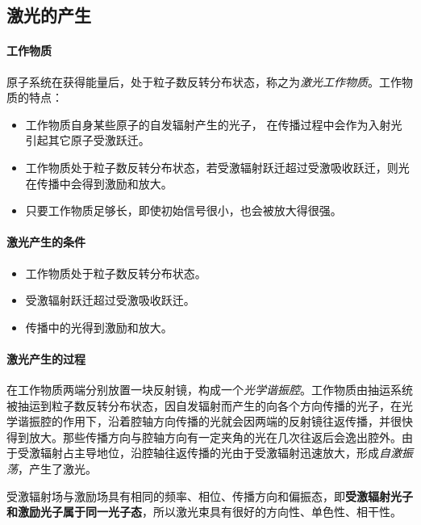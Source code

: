 \subsection{激光的产生} %
\paragraph{工作物质}原子系统在获得能量后，处于粒子数反转分布状态，称之为\textit{激光工作物质}。工作物质的特点：\begin{itemize}
	\item 工作物质自身某些原子的自发辐射产生的光子， 在传播过程中会作为入射光引起其它原子受激跃迁。
	\item 工作物质处于粒子数反转分布状态，若受激辐射跃迁超过受激吸收跃迁，则光在传播中会得到激励和放大。
	\item 只要工作物质足够长，即使初始信号很小，也会被放大得很强。
\end{itemize}

\paragraph{激光产生的条件}\begin{itemize}
	\item 工作物质处于粒子数反转分布状态。
	\item 受激辐射跃迁超过受激吸收跃迁。
	\item 传播中的光得到激励和放大。
\end{itemize}

\paragraph{激光产生的过程}在工作物质两端分别放置一块反射镜，构成一个\textit{光学谐振腔}。工作物质由抽运系统被抽运到粒子数反转分布状态，因自发辐射而产生的向各个方向传播的光子，在光学谐振腔的作用下，沿着腔轴方向传播的光就会因两端的反射镜往返传播，并很快得到放大。那些传播方向与腔轴方向有一定夹角的光在几次往返后会逸出腔外。由于受激辐射占主导地位，沿腔轴往返传播的光由于受激辐射迅速放大，形成\textit{自激振荡}，产生了激光。

受激辐射场与激励场具有相同的频率、相位、传播方向和偏振态，即\textbf{受激辐射光子和激励光子属于同一光子态}，所以激光束具有很好的方向性、单色性、相干性。

